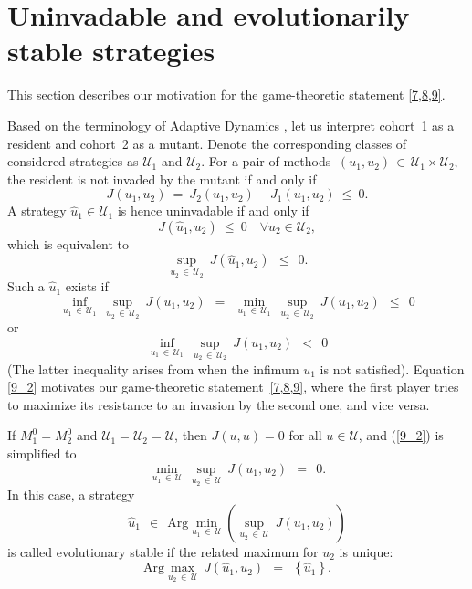 \documentclass[11pt]{amsart}
\begin{document}
\section{Uninvadable and evolutionarily stable strategies}

This section describes our motivation for the game-theoretic statement
{\rm \cref{7,8,9}}.

Based on the terminology of Adaptive Dynamics \cite{DercoleRinaldi2008}, let
us interpret cohort~{\rm 1} as a resident and cohort~{\rm 2} as a mutant.
Denote the corresponding classes of considered strategies as $ \mathcal{U}_1 $
and $ \mathcal{U}_2 $. For a pair of methods
$ \: (u_1, u_2) \, \in \, \mathcal{U}_1 \times \mathcal{U}_2, \: $
the resident is not invaded by the mutant if and only if
$$
J(u_1, u_2) \: = \: J_2(u_1, u_2) - J_1(u_1, u_2) \: \leqslant \: 0.
$$
A strategy 
$ \hat{u}_1 \in \mathcal{U}_1 $
is hence uninvadable if and only if
$$
J \left( \hat{u}_1, u_2 \right) \: \leqslant \: 0 \quad \forall u_2 \in
  \mathcal{U}_2,
$$
which is equivalent to
$$
\sup_{u_2 \, \in \, \mathcal{U}_2} \: J \left( \hat{u}_1, u_2 \right) \:\:
  \leqslant \:\: 0.
$$
Such a $ \hat{u}_1 $ exists if
\begin{equation}
\inf_{u_1 \, \in \, \mathcal{U}_1} \: \sup_{u_2 \, \in \, \mathcal{U}_2} \:
  J(u_1, u_2) \:\: = \:\:
\min_{u_1 \, \in \, \mathcal{U}_1} \: \sup_{u_2 \, \in \, \mathcal{U}_2} \:
  J(u_1, u_2) \:\: \leqslant \:\: 0  \label{9_2}
\end{equation}
or
\begin{equation}
\inf_{u_1 \, \in \, \mathcal{U}_1} \: \sup_{u_2 \, \in \, \mathcal{U}_2} \:
  J(u_1, u_2) \:\: < \:\: 0  \label{9_4}
\end{equation}
(The latter inequality arises from when the infimum $u_1$ is not satisfied).
Equation \cref{9_2} motivates our game-theoretic statement~{\rm \cref{7,8,9},}
where the first player tries to maximize its resistance to an invasion by the
second one{\rm ,} and vice versa.

If $ M_1^0 = M_2^0 $ and $ \mathcal{U}_1 = \mathcal{U}_2 = \mathcal{U} ${\rm ,}
then $ J(u, u) = 0 $ for all $ u \in \mathcal{U} ${\rm ,} and {\rm (\ref{9_2})}
is simplified to
\begin{equation}
\min_{u_1 \, \in \, \mathcal{U}} \: \sup_{u_2 \, \in \, \mathcal{U}} \:
  J(u_1, u_2) \:\: = \:\: 0.  \label{9_3}
\end{equation}
In this case{\rm ,} a strategy
$$
\hat{u}_1 \:\: \in \:\: \mathrm{Arg} \min_{u_1 \, \in \, \mathcal{U}}
  \left( \sup_{u_2 \, \in \, \mathcal{U}} \: J(u_1, u_2) \right)
$$
is called evolutionary stable if the related maximum for $ u_2 $ is
unique{\rm :}
$$
\mathrm{Arg} \max_{u_2 \, \in \, \mathcal{U}} \: J \left( \hat{u}_1, u_2
  \right) \:\: = \:\: \left\{ \hat{u}_1 \right\}.
$$
\end{document}
